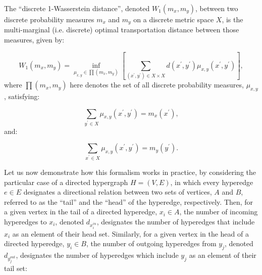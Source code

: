 \documentclass{article}
\begin{document}
\begin{definition}
The ``discrete 1-Wasserstein distance'', denoted ${W_1 \left( m_x, m_y \right)}$, between two discrete probability measures ${m_x}$ and ${m_y}$ on a discrete metric space $X$, is the multi-marginal (i.e. discrete) optimal transportation distance between those measures, given by:

\begin{equation}
W_1 \left( m_x, m_y \right) = \inf_{\mu_{x, y} \in \prod \left( m_x, m_y \right)} \left[ \sum_{\left( x^{\prime}, y^{\prime} \right) \in X \times X} d \left( x^{\prime}, y^{\prime} \right) \mu_{x, y} \left( x^{\prime}, y^{\prime} \right) \right],
\end{equation}
where ${\prod \left( m_x, m_y \right)}$ here denotes the set of all discrete probability measures, ${\mu_{x, y}}$, satisfying:

\begin{equation}
\sum_{y^{\prime} \in X} \mu_{x, y} \left( x^{\prime}, y^{\prime} \right) = m_x \left( x^{\prime} \right),
\end{equation}
and:

\begin{equation}
\sum_{x^{\prime} \in X} \mu_{x, y} \left( x^{\prime}, y^{\prime} \right) = m_y \left( y^{\prime} \right).
\end{equation}
\end{definition}

Let us now demonstrate how this formalism works in practice, by considering the particular case of a directed hypergraph ${H = \left( V, E \right)}$\cite{eidi}, in which every hyperedge ${e \in E}$ designates a directional relation between two sets of vertices, $A$ and $B$, referred to as the ``tail'' and the ``head'' of the hyperedge, respectively. Then, for a given vertex in the tail of a directed hyperedge, ${x_i \in A}$, the number of incoming hyperedges to ${x_i}$, denoted ${d_{x_{i}^{in}}}$, designates the number of hyperedges that include ${x_i}$ as an element of their head set. Similarly, for a given vertex in the head of a directed hyperedge, ${y_i \in B}$, the number of outgoing hyperedges from ${y_j}$, denoted ${d_{y_{j}^{out}}}$, designates the number of hyperedges which include ${y_j}$ as an element of their tail set:
\end{document}
